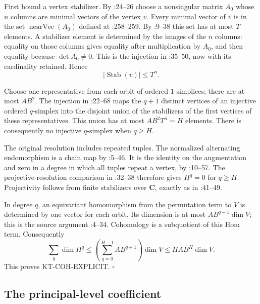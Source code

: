 First bound a vertex stabilizer.  By
:24--26 choose a nonsingular
matrix $A_0$ whose $n$ columns are minimal vectors of the vertex $v$.
Every minimal vector of $v$ is in the set
$\operatorname{nearVec}(A_0)$ defined at
:258--259.
By :9--38 this set has at most
$T$ elements.  A stabilizer element is determined by the images of
the $n$ columns: equality on those columns gives equality after
multiplication by $A_0$, and then equality because $\det A_0\ne0$.
This is the injection in :35--50, now with its
cardinality retained.  Hence
\[
 |\operatorname{Stab}(v)|\le T^n.
\tag{KT-C7.3}
\]

Choose one representative from each orbit of ordered $1$-simplices;
there are at most $AB^2$.  The injection in
:22--68
maps the $q+1$ distinct vertices of an injective ordered $q$-simplex
into the disjoint union of the stabilizers of the first vertices of
these representatives.  This union has at most $AB^2T^n=H$ elements.
There is consequently no injective $q$-simplex when $q\ge H$.

The original resolution includes repeated tuples.  The normalized
alternating endomorphism is a chain map by
:5--46.
It is the identity on the augmentation and zero in a degree in which
all tuples repeat a vertex, by
:10--57.
The projective-resolution comparison in
:32--38
therefore gives $H^q=0$ for $q\ge H$.
Projectivity follows from finite stabilizers over $\mathbf C$, exactly
as in :41--49.

In degree $q$, an equivariant homomorphism from the permutation term
to $V$ is determined by one vector for each orbit.  Its dimension is
at most $AB^{q+1}\dim V$; this is the source argument
:4--34.
Cohomology is a subquotient of this Hom term.  Consequently
\[
 \sum_q\dim H^q
 \le\left(\sum_{q=0}^{H-1}AB^{q+1}\right)\dim V
 \le HAB^H\dim V.
\]
This proves KT-COH-EXPLICIT. \hfill$\square$

\subsection{The principal-level coefficient}


